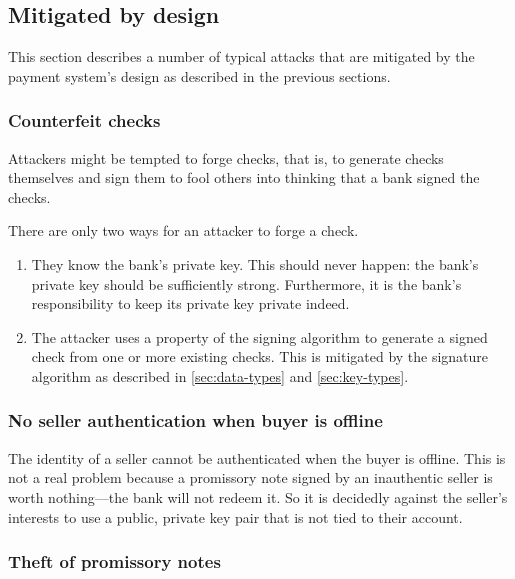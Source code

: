 \documentclass[12pt,a4paper]{article}
\begin{document}
\begin{multicols}{2}
	\subsection{Mitigated by design}
	
	This section describes a number of typical attacks that are mitigated by the payment system's design as described in the previous sections.

	\subsubsection{Counterfeit checks}

	Attackers might be tempted to forge checks, that is, to generate checks themselves and sign them to fool others into thinking that a bank signed the checks.
	
	There are only two ways for an attacker to forge a check.
	
	\begin{enumerate}
		\item They know the bank's private key. This should never happen: the bank's private key should be sufficiently strong. Furthermore, it is the bank's responsibility to keep its private key private indeed.
		
		\item The attacker uses a property of the signing algorithm to generate a signed check from one or more existing checks. This is mitigated by the signature algorithm as described in \autoref{sec:data-types} and \autoref{sec:key-types}.
	\end{enumerate}

	\subsubsection{No seller authentication when buyer is offline} \label{sec:lack-of-seller-authentication}

	The identity of a seller cannot be authenticated when the buyer is offline. This is not a real problem because a promissory note signed by an inauthentic seller is worth nothing---the bank will not redeem it. So it is decidedly against the seller's interests to use a public, private key pair that is not tied to their account.
	
	\subsubsection{Theft of promissory notes}


\end{multicols}
\end{document}
